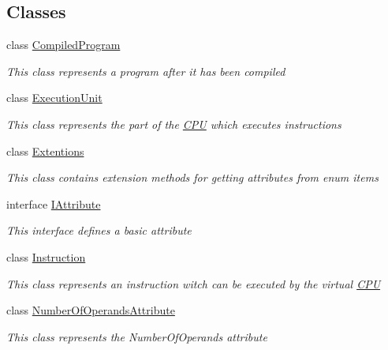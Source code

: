 \subsection*{Classes}
\begin{DoxyCompactItemize}
\item 
class \hyperlink{class_c_p_u___o_s___simulator_1_1_c_p_u_1_1_compiled_program}{Compiled\+Program}
\begin{DoxyCompactList}\small\item\em This class represents a program after it has been compiled \end{DoxyCompactList}\item 
class \hyperlink{class_c_p_u___o_s___simulator_1_1_c_p_u_1_1_execution_unit}{Execution\+Unit}
\begin{DoxyCompactList}\small\item\em This class represents the part of the \hyperlink{namespace_c_p_u___o_s___simulator_1_1_c_p_u}{C\+P\+U} which executes instructions \end{DoxyCompactList}\item 
class \hyperlink{class_c_p_u___o_s___simulator_1_1_c_p_u_1_1_extentions}{Extentions}
\begin{DoxyCompactList}\small\item\em This class contains extension methods for getting attributes from enum items \end{DoxyCompactList}\item 
interface \hyperlink{interface_c_p_u___o_s___simulator_1_1_c_p_u_1_1_i_attribute}{I\+Attribute}
\begin{DoxyCompactList}\small\item\em This interface defines a basic attribute \end{DoxyCompactList}\item 
class \hyperlink{class_c_p_u___o_s___simulator_1_1_c_p_u_1_1_instruction}{Instruction}
\begin{DoxyCompactList}\small\item\em This class represents an instruction witch can be executed by the virtual \hyperlink{namespace_c_p_u___o_s___simulator_1_1_c_p_u}{C\+P\+U} \end{DoxyCompactList}\item 
class \hyperlink{class_c_p_u___o_s___simulator_1_1_c_p_u_1_1_number_of_operands_attribute}{Number\+Of\+Operands\+Attribute}
\begin{DoxyCompactList}\small\item\em This class represents the Number\+Of\+Operands attribute \end{DoxyCompactList}\item 

\end{DoxyCompactItemize}

